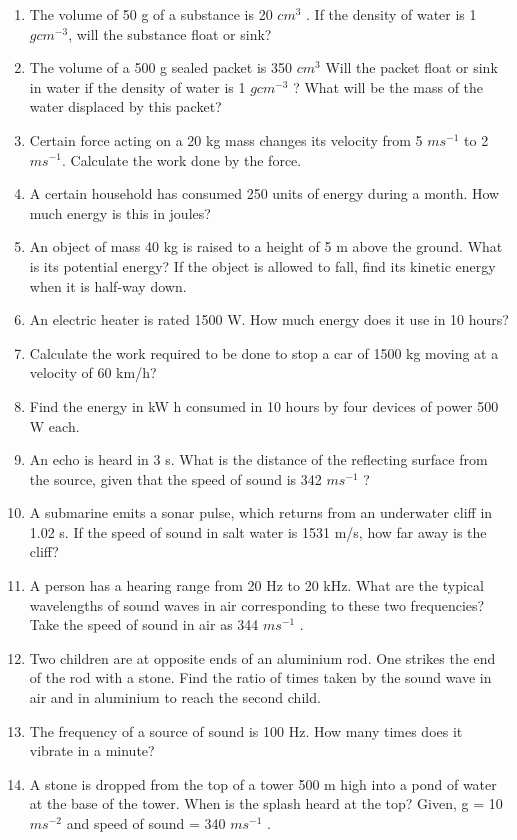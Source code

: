\begin{enumerate}[label=\arabic*.,ref=\thesection.\theenumi]
\item The volume of 50 g of a substance is 20 $cm^3$ 
. If the density of water is 1 $g cm^{-3}$, will the substance float or sink? 
\item  The volume of a 500 g sealed packet is 350 $cm^3$
Will the packet float or sink in water if the density of water is 1 $g cm^{-3}$ ? What will be the mass of the water displaced by this packet?
\item Certain force acting on a 20 kg mass changes its velocity from 5 $m s^{-1}$
to 2 $m s^{-1}$. Calculate the work done by the force.
\item A certain household has consumed 250 units of energy during a month. How much energy is this in joules?
\item  An object of mass 40 kg is raised to a height of 5 m above the ground. What is its potential energy? If the object is allowed to fall, find its kinetic energy when it is half-way down.
\item An electric heater is rated 1500 W. How much energy does it use in 10 hours?
\item Calculate the work required to be done to stop a car of 1500 kg moving at a velocity of 60 km/h?
\item Find the energy in kW h consumed in 10 hours by four devices of power 500 W each.
\item An echo is heard in 3 s. What is the distance of the reflecting surface from the source, given that the speed of sound is 342 $m s^{-1}$
?  
\item A submarine emits a sonar pulse, which returns from an underwater cliff in 1.02 s. If the speed of sound in salt water is 1531 m/s, how far away is the cliff?
\item A person has a hearing range from 20 Hz to 20 kHz. What are the typical wavelengths of sound waves in air corresponding to these two frequencies? Take the speed of sound in air as 344 $m s^{-1}$
.
\item Two children are at opposite ends of an aluminium rod. One strikes the end of the rod with a stone. Find the ratio of times taken by the sound wave in air and in aluminium to reach the second child.
\item  The frequency of a source of sound is 100 Hz. How many times does it vibrate in a minute?
\item A stone is dropped from the top of a tower 500 m high into a pond of water at the base of the tower. When is the splash heard at the top? Given, g = 10 $m s^{-2}$
and speed of sound = 340 $m s^{-1}$ . 

\end{enumerate}
